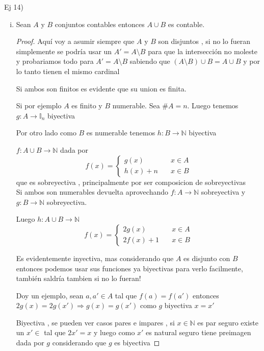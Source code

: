 \documentclass[12pt]{article}
\newcommand{\I}{\mathbb{I}}
\newcommand{\N}{\mathbb{N}}
\newcommand{\Ra}{\Rightarrow}
\newcommand{\ra}{\rightarrow}
\theoremstyle{definition}
\begin{document}
\noindent Ej 14) 

\begin{enumerate}[i.]
  \item Sean $A$ y $B$ conjuntos contables entonces $A \cup B$ es contable.
    \begin{proof}
    Aquí voy a asumir siempre que $A$ y $B$ son disjuntos , si no lo fueran simplemente se podría usar un $A' = A \setminus B$ para que la intersección no moleste y probariamos todo para $A' = A \setminus B$ sabiendo que $(A \setminus B ) \cup B = A \cup B$ y por lo tanto tienen el mismo cardinal
      
      Si ambos son finitos es evidente que su union es finita.
      
      Si por ejemplo $A$ es finito y $B$ numerable. Sea $\# A = n$. Luego tenemos $g: A \ra \I_{n}$ biyectiva

      Por otro lado como $B$ es numerable tenemos $h: B \ra \N$ biyectiva

      $f : A \cup B \ra \N$ dada por 
$$
f(x) = \left\{
        \begin{array}{ll}
	  g(x)  & \quad x \in A \\
	  h(x) + n  & \quad x \in B 
        \end{array}
    \right.
$$
que es sobreyectiva , principalmente por ser composicion de sobreyectivas\\

Si ambos son numerables devuelta aprovechando $f: A \ra \N$ sobreyectiva y $g: B \ra \N$ sobreyectiva.

Luego $h: A \cup B \ra \N$
$$
f(x) = \left\{
        \begin{array}{ll}
	  2g(x)  & \quad x \in A \\
	  2f(x) + 1  & \quad x \in B 
        \end{array}
    \right.
$$

Es evidentemente inyectiva, mas considerando que $A$ es disjunto con $B$ entonces podemos usar sus funciones ya biyectivas para verlo facilmente, también saldría tambien si no lo fueran!

Doy un ejemplo, sean $a,a' \in A$ tal que $f(a) = f(a')$ entonces $2g(x) = 2g(x') \Ra g(x) = g(x')$ como $g$ biyectiva $x = x'$

Biyectiva , se pueden ver casos pares e impares , si $x \in \N$ es par seguro existe un $x' \in$ tal que $2x' = x$ y luego como $x'$ es natural seguro tiene preimagen dada por $g$ considerando que $g$ es biyectiva
   
    \end{proof}



\end{enumerate}
\end{document}
